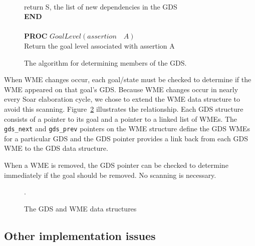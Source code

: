 {\begin{figure}[h]
{\begin{minipage}{\textwidth}
\begin{tabbing}
\\
\> return S, the list of new dependencies in the GDS \\ 
\textbf{END} \\



\\
\textbf{PROC} $GoalLevel(assertion \quad A)$ \\
\> Return the goal level associated with assertion A

\end{tabbing}
\end{minipage}
}
\caption{The algorithm for determining members of the GDS.}
\label{tab:dhj:proc}
\end{figure}


When WME changes occur, each goal/state must be checked to determine
if the WME appeared on that goal's GDS. Because WME changes occur in
nearly every Soar elaboration cycle, we chose to extend the WME data
structure to avoid this scanning.  Figure~\ref{wme} illustrates the
relationship.  Each GDS structure consists of a pointer to its goal and a
pointer to a linked list of WMEs.  The \verb+gds_next+ and \verb+gds_prev+ pointers on
the WME structure define the GDS WMEs for a particular GDS and the GDS pointer
provides a link back from each GDS WME to the GDS data structure.

When a WME is removed, the GDS pointer can be checked to determine
immediately if the goal should be removed.  No scanning is necessary.


\begin{figure}
\caption{The GDS and WME data structures}.
\label{wme}
\end{figure}

\subsection*{Other implementation issues}

\begin{itemize}


\end{itemize}}
